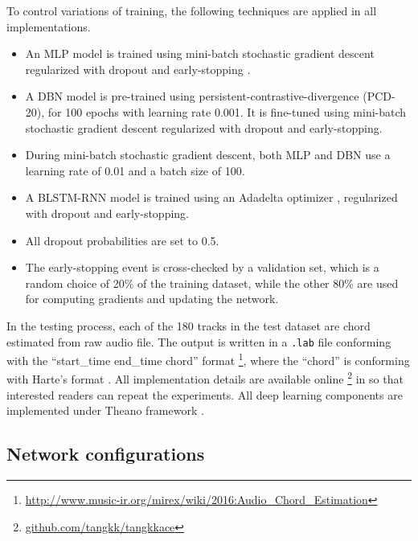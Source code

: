 To control variations of training, the following techniques are applied in all implementations. 
\begin{itemize}
\item An MLP model is trained using mini-batch stochastic gradient descent regularized with dropout \cite{srivastava2014dropout} and early-stopping \cite{prechelt1998automatic}. 
\item A DBN model is pre-trained using persistent-contrastive-divergence \cite{tieleman2008training} (PCD-20), for 100 epochs with learning rate 0.001. It is fine-tuned using mini-batch stochastic gradient descent regularized with dropout and early-stopping.
\item During mini-batch stochastic gradient descent, both MLP and DBN use a learning rate of 0.01 and a batch size of 100. 
\item A BLSTM-RNN model is trained using an Adadelta optimizer \cite{zeiler2012adadelta}, regularized with dropout and early-stopping. 
\item All dropout probabilities are set to 0.5. 
\item The early-stopping event is cross-checked by a validation set, which is a random choice of 20\% of the training dataset, while the other 80\% are used for computing gradients and updating the network.
\end{itemize}

In the testing process, each of the 180 tracks in the test dataset are chord estimated from raw audio file. The output is written in a {\tt .lab} file conforming with the ``start\_time end\_time chord'' format \footnote{\url{http://www.music-ir.org/mirex/wiki/2016:Audio\_Chord\_Estimation}}, where the ``chord'' is conforming with Harte's format \cite{harte2005symbolic}. All implementation details are available online \footnote{\url{github.com/tangkk/tangkkace}} in so that interested readers can repeat the experiments. All deep learning components are implemented under Theano framework \cite{bergstra2010theano}.

\subsection{Network configurations} \label{sec:3-p2}

